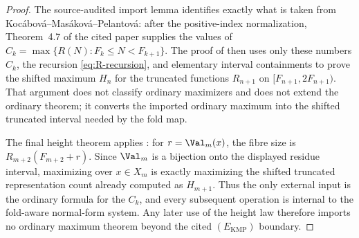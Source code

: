 \begin{proof}
The source-audited import lemma identifies exactly what is taken from
Koc\'abov\'a--Mas\'akov\'a--Pelantov\'a: after the positive-index normalization,
Theorem~4.7 of the cited paper supplies the values of
\(C_k=\max\{R(N):F_k\le N<F_{k+1}\}\).  The proof of
 then uses only these
numbers \(C_k\), the recursion \eqref{eq:R-recursion}, and elementary interval
containments to prove the shifted maximum \(H_n\) for the truncated functions
\(R_{n+1}\) on \([F_{n+1},2F_{n+1})\).  That argument does not classify ordinary
maximizers and does not extend the ordinary theorem; it converts the imported
ordinary maximum into the shifted truncated interval needed by the fold map.

The final height theorem applies :
for \(r=\Val_m(x)\), the fibre size is
\(R_{m+2}(F_{m+2}+r)\).  Since \(\Val_m\) is a bijection onto the displayed
residue interval, maximizing over \(x\in X_m\) is exactly maximizing the shifted
truncated representation count already computed as \(H_{m+1}\).  Thus the only
external input is the ordinary formula for the \(C_k\), and every subsequent
operation is internal to the fold-aware normal-form system.  Any later use of the
height law therefore imports no ordinary maximum theorem beyond the cited
\((E_{\mathrm{KMP}})\) boundary.
\end{proof}

